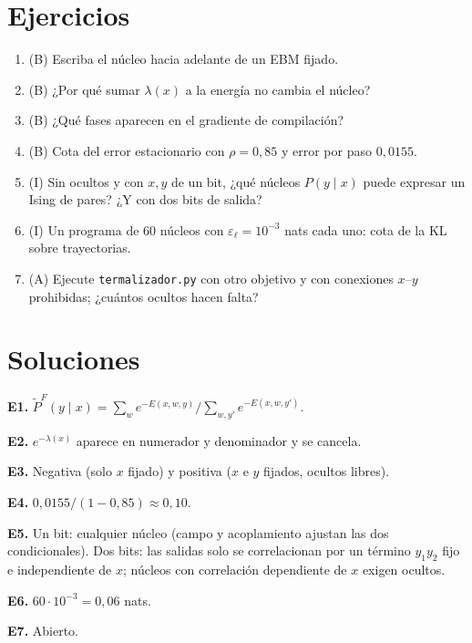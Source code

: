 \documentclass[11pt,a4paper]{article}
\begin{document}
\section{Ejercicios}
\begin{enumerate}[label=\textbf{E\arabic*.}]
\item (B) Escriba el núcleo hacia adelante de un EBM fijado.
\item (B) ¿Por qué sumar $\lambda(x)$ a la energía no cambia el núcleo?
\item (B) ¿Qué fases aparecen en el gradiente de compilación?
\item (B) Cota del error estacionario con $\rho=0{,}85$ y error por paso $0{,}0155$.
\item (I) Sin ocultos y con $x,y$ de un bit, ¿qué núcleos $P(y\mid x)$ puede expresar un Ising de pares? ¿Y con dos bits de salida?
\item (I) Un programa de 60 núcleos con $\varepsilon_\ell=10^{-3}$ nats cada uno: cota de la KL sobre trayectorias.
\item (A) Ejecute \texttt{termalizador.py} con otro objetivo y con conexiones $x$--$y$ prohibidas; ¿cuántos ocultos hacen falta?
\end{enumerate}
\section{Soluciones}
\begin{solucion}
\textbf{E1.} $\tilde P^F(y\mid x)=\sum_we^{-E(x,w,y)}/\sum_{w,y'}e^{-E(x,w,y')}$.

\textbf{E2.} $e^{-\lambda(x)}$ aparece en numerador y denominador y se cancela.

\textbf{E3.} Negativa (solo $x$ fijado) y positiva ($x$ e $y$ fijados, ocultos libres).

\textbf{E4.} $0{,}0155/(1-0{,}85)\approx0{,}10$.

\textbf{E5.} Un bit: cualquier núcleo (campo y acoplamiento ajustan las dos condicionales). Dos bits: las salidas solo se correlacionan por un término $y_1y_2$ fijo e
independiente de $x$; núcleos con correlación dependiente de $x$ exigen ocultos.

\textbf{E6.} $60\cdot10^{-3}=0{,}06$ nats.

\textbf{E7.} Abierto.
\end{solucion}
\end{document}
